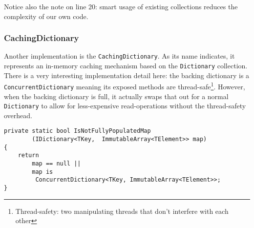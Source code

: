 Notice also the note on line 20: smart usage of existing collections reduces the complexity of our own code.

\subsubsection{CachingDictionary}
\label{sec:spec-coll-cachingdictionary}

Another implementation is the \verb|CachingDictionary|. As its name indicates, it represents an in-memory caching mechanism based on the \verb|Dictionary| collection. There is a very interesting implementation detail here: the backing dictionary is a \verb|ConcurrentDictionary| meaning its exposed methods are thread-safe\footnote{Thread-safety: two manipulating threads that don't interfere with each other}. However, when the backing dictionary is full, it actually swaps that out for a normal \verb|Dictionary| to allow for less-expensive read-operations without the thread-safety overhead.

\begin{lstlisting}
private static bool IsNotFullyPopulatedMap
		(IDictionary<TKey,	ImmutableArray<TElement>> map)
{
	return 
		map == null || 
		map is 
		 ConcurrentDictionary<TKey, ImmutableArray<TElement>>;
}
\end{lstlisting}

